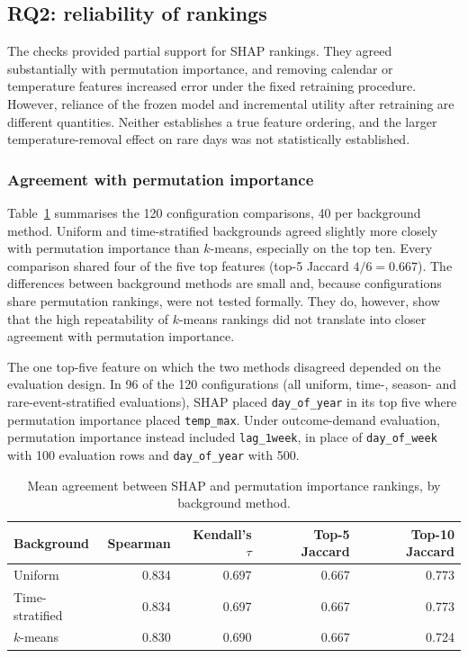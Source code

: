 \documentclass[11pt,a4paper]{article}
\newcommand{\feat}[1]{\texttt{#1}}
\begin{document}
\subsection{RQ2: reliability of rankings}\label{sec:rq2}

The checks provided partial support for SHAP rankings. They agreed substantially with permutation importance, and removing calendar or temperature features increased error under the fixed retraining procedure. However, reliance of the frozen model and incremental utility after retraining are different quantities. Neither establishes a true feature ordering, and the larger temperature-removal effect on rare days was not statistically established.

\subsubsection{Agreement with permutation importance}
Table~\ref{tab:rq2agreement} summarises the 120 configuration comparisons, 40 per background method. Uniform and time-stratified backgrounds agreed slightly more closely with permutation importance than $k$-means, especially on the top ten. Every comparison shared four of the five top features (top-5 Jaccard $4/6 = 0.667$). The differences between background methods are small and, because configurations share permutation rankings, were not tested formally. They do, however, show that the high repeatability of $k$-means rankings did not translate into closer agreement with permutation importance.

The one top-five feature on which the two methods disagreed depended on the evaluation design. In 96 of the 120 configurations (all uniform, time-, season- and rare-event-stratified evaluations), SHAP placed \feat{day\_of\_year} in its top five where permutation importance placed \feat{temp\_max}. Under outcome-demand evaluation, permutation importance instead included \feat{lag\_1week}, in place of \feat{day\_of\_week} with 100 evaluation rows and \feat{day\_of\_year} with 500.

\begin{table}[htbp]
\centering\small
\caption{Mean agreement between SHAP and permutation importance rankings, by background method.}
\label{tab:rq2agreement}
\begin{tabular}{l r r r r}
\toprule
Background & Spearman & Kendall's $\tau$ & Top-5 Jaccard & Top-10 Jaccard \\
\midrule
Uniform & 0.834 & 0.697 & 0.667 & 0.773 \\
Time-stratified & 0.834 & 0.697 & 0.667 & 0.773 \\
$k$-means & 0.830 & 0.690 & 0.667 & 0.724 \\
\bottomrule
\end{tabular}
\end{table}
\end{document}
